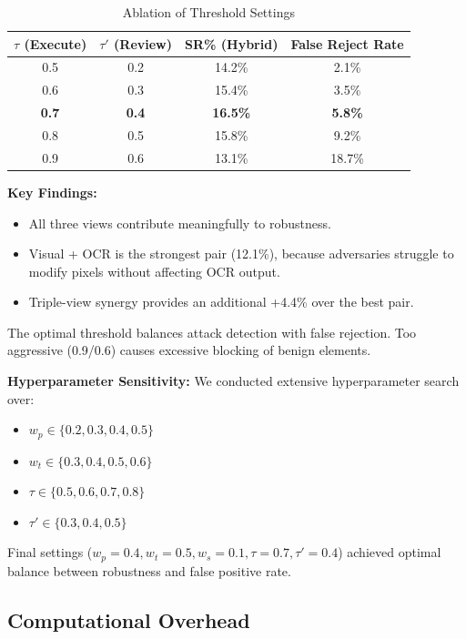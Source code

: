 \documentclass{llncs}
\begin{document}
\begin{table}[ht]
\caption{Ablation of Threshold Settings}
\centering
\begin{tabular}{|c|c|c|c|}
\hline
$\tau$ (Execute) & $\tau'$ (Review) & SR\% (Hybrid) & False Reject Rate \\
\hline
0.5 & 0.2 & 14.2\% & 2.1\% \\
0.6 & 0.3 & 15.4\% & 3.5\% \\
\textbf{0.7} & \textbf{0.4} & \textbf{16.5\%} & \textbf{5.8\%} \\
0.8 & 0.5 & 15.8\% & 9.2\% \\
0.9 & 0.6 & 13.1\% & 18.7\% \\
\hline
\end{tabular}
\end{table}

\textbf{Key Findings:}
\begin{itemize}
    \item All three views contribute meaningfully to robustness.
    \item Visual + OCR is the strongest pair (12.1\%), because adversaries struggle to modify pixels without affecting OCR output.
    \item Triple-view synergy provides an additional +4.4\% over the best pair.
\end{itemize}
The optimal threshold balances attack detection with false rejection. Too aggressive (0.9/0.6) causes excessive blocking of benign elements.

\textbf{Hyperparameter Sensitivity:}
We conducted extensive hyperparameter search over:
\begin{itemize}
    \item $w_p \in \{0.2, 0.3, 0.4, 0.5\}$
    \item $w_t \in \{0.3, 0.4, 0.5, 0.6\}$  
    \item $\tau \in \{0.5, 0.6, 0.7, 0.8\}$
    \item $\tau' \in \{0.3, 0.4, 0.5\}$
\end{itemize}
Final settings ($w_p=0.4, w_t=0.5, w_s=0.1, \tau=0.7, \tau'=0.4$) achieved optimal balance between robustness and false positive rate.

\subsection{Computational Overhead}
\end{document}
